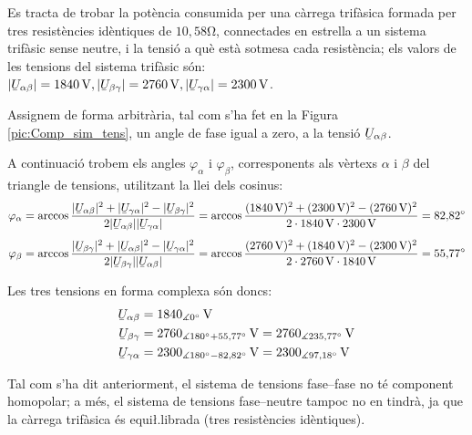 \begin{exemple}
Es tracta de trobar la pot\`{e}ncia consumida per una c\`{a}rrega trif\`{a}sica
formada per tres resist\`{e}ncies id\`{e}ntiques de $10{,}58\unit{\ohm}$,
connectades en estrella a un sistema trif\`{a}sic sense neutre, i la
tensi\'{o} a qu\`{e} est\`{a} sotmesa cada resist\`{e}ncia; els valors de les
tensions del sistema trif\`{a}sic s\'{o}n: $|\cmplx{U}_{\alpha\beta}| =
1840\unit{V}, |\cmplx{U}_{\beta\gamma}| = 2760\unit{V},
|\cmplx{U}_{\gamma\alpha}| = 2300\unit{V}$.

Assignem de forma arbitr\`{a}ria, tal com s'ha fet en la Figura
\vref{pic:Comp_sim_tens}, un angle de fase igual a zero, a la tensi\'{o}
$\cmplx{U}_{\alpha\beta}$.

A continuaci\'{o} trobem els angles $\varphi_\alpha$ i $\varphi_\beta$,
corresponents als v\`{e}rtexs  $\alpha$ i $\beta$ del triangle de
tensions, utilitzant la llei dels cosinus: 
\begin{align*}
    \varphi_\alpha &= \arccos \frac{|\cmplx{U}_{\alpha\beta}|^2 + |\cmplx{U}_{\gamma\alpha}|^2 -
    |\cmplx{U}_{\beta\gamma}|^2}{2 |\cmplx{U}_{\alpha\beta}| |\cmplx{U}_{\gamma\alpha}|} =
    \arccos \frac{(1840\unit{V})^2 + (2300\unit{V})^2 - (2760\unit{V})^2}{2 \cdot 1840\unit{V}
    \cdot 2300\unit{V}} = 82{,}82\degree \\[1ex]
    \varphi_\beta &= \arccos \frac{|\cmplx{U}_{\beta\gamma}|^2 + |\cmplx{U}_{\alpha\beta}|^2 -
    |\cmplx{U}_{\gamma\alpha}|^2}{2 |\cmplx{U}_{\beta\gamma}| |\cmplx{U}_{\alpha\beta}|} =
    \arccos \frac{(2760\unit{V})^2 + (1840\unit{V})^2 - (2300\unit{V})^2}{2 \cdot 2760\unit{V}
    \cdot 1840\unit{V}} = 55{,}77\degree
\end{align*}

Les tres tensions en forma complexa s\'{o}n doncs:
\begin{align*}
\cmplx{U}_{\alpha\beta} &= 1840_{\measuredangle 0\degree}\unit{V} \\
\cmplx{U}_{\beta\gamma} &= 2760_{\measuredangle 180\degree +
55{,}77\degree}\unit{V} =
2760_{\measuredangle 235{,}77\degree}\unit{V} \\
\cmplx{U}_{\gamma\alpha} &= 2300_{\measuredangle 180\degree -
82{,}82\degree}\unit{V} = 2300_{\measuredangle 97{,}18\degree}
\unit{V}
\end{align*}

Tal com s'ha dit anteriorment, el sistema de tensions fase--fase no
t\'{e} component homopolar; a m\'{e}s, el sistema de tensions fase--neutre
tampoc no en tindr\`{a}, ja que la c\`{a}rrega trif\`{a}sica \'{e}s equi{\l.l}ibrada
(tres resist\`{e}ncies id\`{e}ntiques).


\end{exemple}
